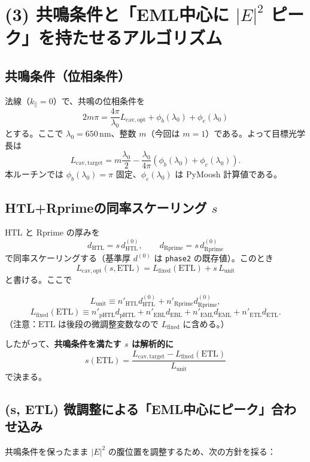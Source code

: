 \section{(3) 共鳴条件と「EML中心に \(|E|^2\) ピーク」を持たせるアルゴリズム}

\subsection{共鳴条件（位相条件）}
法線（\(k_\parallel=0\)）で、共鳴の位相条件を
\[
2m\pi = \frac{4\pi}{\lambda_0}L_{\mathrm{cav,opt}} + \phi_b(\lambda_0)+\phi_e(\lambda_0)
\]
とする。ここで \(\lambda_0=650\,\mathrm{nm}\)、整数 \(m\)（今回は \(m=1\)）である。よって目標光学長は
\[
L_{\mathrm{cav,target}}=
m\frac{\lambda_0}{2}-\frac{\lambda_0}{4\pi}\left(\phi_b(\lambda_0)+\phi_e(\lambda_0)\right).
\]
本ルーチンでは \(\phi_b(\lambda_0)=\pi\) 固定、\(\phi_e(\lambda_0)\) は PyMoosh 計算値である。

\subsection{HTL+Rprimeの同率スケーリング \(s\)}
\(\text{HTL}\) と \(\text{Rprime}\) の厚みを
\[
d_{\mathrm{HTL}}=s\,d_{\mathrm{HTL}}^{(0)},\qquad
d_{\mathrm{Rprime}}=s\,d_{\mathrm{Rprime}}^{(0)}
\]
で同率スケーリングする（基準厚 \(d^{(0)}\) は \texttt{phase2} の既存値）。このとき
\[
L_{\mathrm{cav,opt}}(s,\mathrm{ETL})=
L_{\mathrm{fixed}}(\mathrm{ETL}) + s\,L_{\mathrm{unit}}
\]
と書ける。ここで

\[
L_{\mathrm{unit}} \equiv
n'_{\mathrm{HTL}} d_{\mathrm{HTL}}^{(0)}+
n'_{\mathrm{Rprime}} d_{\mathrm{Rprime}}^{(0)},
\]
\[
L_{\mathrm{fixed}}(\mathrm{ETL}) \equiv
n'_{\mathrm{pHTL}} d_{\mathrm{pHTL}}+
n'_{\mathrm{EBL}} d_{\mathrm{EBL}}+
n'_{\mathrm{EML}} d_{\mathrm{EML}}+
n'_{\mathrm{ETL}} d_{\mathrm{ETL}}.
\]
（注意：\(\mathrm{ETL}\) は後段の微調整変数なので \(L_{\mathrm{fixed}}\) に含める。）

したがって、\textbf{共鳴条件を満たす \(s\) は解析的に}
\[
s(\mathrm{ETL})=
\frac{L_{\mathrm{cav,target}}-L_{\mathrm{fixed}}(\mathrm{ETL})}{L_{\mathrm{unit}}}
\]
で決まる。

\subsection{(s, ETL) 微調整による「EML中心にピーク」合わせ込み}
共鳴条件を保ったまま \(|E|^2\) の腹位置を調整するため、次の方針を採る：

